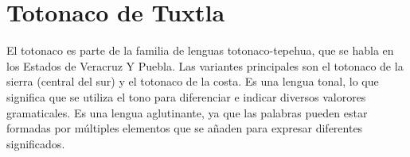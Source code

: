 \section*{Totonaco de Tuxtla}

\noindent  El totonaco es parte de la familia de lenguas totonaco-tepehua, que se habla en los Estados de Veracruz Y Puebla. Las variantes principales son el totonaco de la sierra (central del sur) y el totonaco de la costa. Es una lengua tonal, lo que significa que se utiliza el tono para diferenciar e indicar diversos valorores gramaticales. Es una lengua aglutinante, ya que las palabras pueden estar formadas por múltiples elementos que se añaden para expresar diferentes significados.
